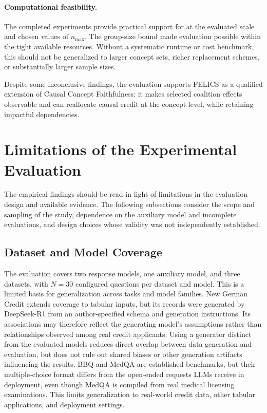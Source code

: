 \paragraph{Computational feasibility.}
The completed experiments provide practical support for  at the evaluated scale and chosen values of $n_{\max}$. The group-size bound made evaluation possible within the tight available resources. Without a systematic runtime or cost benchmark, this should not be generalized to larger concept sets, richer replacement schemes, or substantially larger sample sizes.

Despite some inconclusive findings, the evaluation supports FELICS as a qualified extension of Causal Concept Faithfulness: it makes selected coalition effects observable and can reallocate causal credit at the concept level, while retaining impactful dependencies.

\section{Limitations of the Experimental Evaluation}
\label{sec:experimental_limitations}

The empirical findings should be read in light of limitations in the evaluation design and available evidence. The following subsections consider the scope and sampling of the study, dependence on the auxiliary model and incomplete evaluations, and design choices whose validity was not independently established.

\subsection{Dataset and Model Coverage}

The evaluation covers two response models, one auxiliary model, and three datasets, with $N=30$ configured questions per dataset and model. This is a limited basis for generalization across tasks and model families. New German Credit extends coverage to tabular inputs, but its records were generated by DeepSeek-R1 from an author-specified schema and generation instructions. Its associations may therefore reflect the generating model's assumptions rather than relationships observed among real credit applicants. Using a generator distinct from the evaluated models reduces direct overlap between data generation and evaluation, but does not rule out shared biases or other generation artifacts influencing the results. BBQ and MedQA are established benchmarks, but their multiple-choice format differs from the open-ended requests LLMs receive in deployment, even though MedQA is compiled from real medical licensing examinations. This limits generalization to real-world credit data, other tabular applications, and deployment settings.


